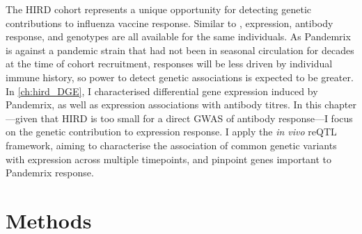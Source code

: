 The \gls{HIRD} cohort represents a unique opportunity for detecting genetic contributions to influenza vaccine response.
Similar to \textcite{franco2013IntegrativeGenomicAnalysis},
expression, antibody response, and genotypes are all available for the same individuals.
As Pandemrix is against a pandemic strain that had not been in seasonal circulation for decades at the time of cohort recruitment, 
responses will be less driven by individual immune history,
so power to detect genetic associations is expected to be greater.
In \cref{ch:hird_DGE}, I characterised differential gene expression induced by Pandemrix, as well as expression associations with antibody titres.
In this chapter---given that \gls{HIRD} is too small for a direct \gls{GWAS} of antibody response---I focus on the genetic contribution to expression response.
I apply the \textit{in vivo} \gls{reQTL} framework, 
aiming to characterise the association of common genetic variants with expression across multiple timepoints,
and pinpoint genes important to Pandemrix response.

\section{Methods}

